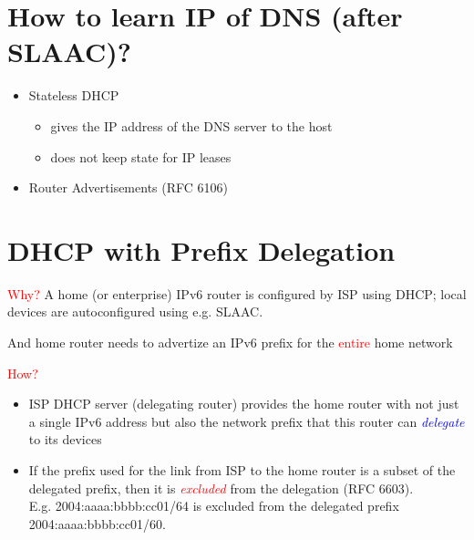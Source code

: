 \documentclass[11pt]{article}
\begin{document}
\section*{How to learn IP of DNS (after SLAAC)?}

\begin{itemize}
	\item Stateless DHCP
	\begin{itemize}
		\item gives the IP address of the DNS server to the host
	\item does not keep state for IP leases
\end{itemize}
	
\end{itemize}

\begin{itemize}
	\item Router Advertisements (RFC 6106)
	
\end{itemize}

\section*{DHCP with Prefix Delegation}

\textcolor{red}{Why?} A home (or enterprise) IPv6 router is configured by ISP using DHCP; local devices are autoconfigured using e.g. SLAAC.

And home router needs to advertize an IPv6 prefix for the \textcolor{red}{entire} home network

\textcolor{red}{How?}
\begin{itemize}
	\item ISP DHCP server (delegating router) provides the home router with not just a single IPv6 address but also the network prefix that this router can \textcolor{blue}{\textit{delegate}} to its devices
	\item  If the prefix used for the link from ISP to the home router is a subset of the delegated prefix, then it is \textcolor{red}{\textit{excluded}} from the delegation (RFC 6603). \\
E.g. 2004:aaaa:bbbb:cc01/64 is excluded from the delegated prefix 2004:aaaa:bbbb:cc01/60.
\end{itemize}
\end{document}

